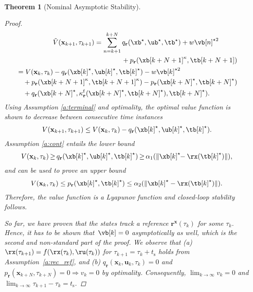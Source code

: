 \documentclass[journal]{IEEEtran}
\newcommand{\x}{{\mathbf{x}}}
\renewcommand{\u}{{\mathbf{u}}}
\renewcommand{\r}{{\mathbf{r}}}
\newcommand{\bx}{{\x}}
\newcommand{\bu}{{\u}}
\newcommand{\btau}{{\tau}}
\newcommand{\review}[1]{#1}
\newtheorem{Theorem}{Theorem}
\begin{document}
\begin{Theorem} [Nominal Asymptotic Stability]
\begin{proof}
			\begin{align*}
			\begin{aligned}\begin{split}
			\tilde{V}(\x_{k+1},\tau_{k+1})&=\sum_{n=k+1}^{k+N} q_\r(\xb^\star,\ub^\star,\tb^\star)  + w\vb[n]^{\star{}2}\\&\qquad\qquad+ p_\r(\xb[k+N+1]^\kappa,\tb[k+N+1])
			\end{split}\\
			\end{aligned}\\
			\begin{aligned}
			&=V(\x_k,\tau_k) - q_\r(\xb[k]^\star,\ub[k]^\star,\tb[k]^\star) - w\vb[k]^{\star{}2}\\
			&\quad+ p_\r(\xb[k+N+1]^\kappa,\tb[k+N+1]^\kappa) - p_\r(\xb[k+N]^\star,\tb[k+N]^\star)\\
			&\quad+ q_\r(\xb[k+N]^\star,\kappa^\mathrm{f}_\r(\xb[k+N]^\star,\tb[k+N]^\star),\tb[k+N]^\star).
			\end{aligned}
			\end{align*}
			Using Assumption \ref{a:terminal} and optimality, the optimal value function is shown to decrease between consecutive time instances
			\begin{equation}
			V(\x_{k+1},\tau_{k+1}) 
			\leq{} V(\x_k,\tau_k) - q_\r(\xb[k]^\star,\ub[k]^\star,\tb[k]^\star).
			\end{equation}
			Assumption \ref{a:cont} entails the lower bound 
			\begin{equation}
			V(\x_k,\tau_k)\hspace{-.1em}\geq{}\hspace{-.1em}q_\r(\xb[k]^\star,\ub[k]^\star,\tb[k]^\star)
			\hspace{-.1em}\geq{}\hspace{-.1em}\alpha_1(\|\xb[k]^\star\hspace{-0.3em}-\rx(\tb[k]^\star)\|),
			\end{equation}
			and can be used to prove an upper bound \cite[Proposition 2.17]{rawlings2009model}
			\begin{equation}
			V(\x_k,\tau_k) \leq{} p_\r(\xb[k]^\star,\tb[k]^\star) \leq{} \alpha_2(\|\xb[k]^\star-\rx(\tb[k]^\star)\|).
			\end{equation}
			Therefore, the value function is a Lyapunov function and closed-loop stability follows. 
			
			So far, we have proven that the states track a reference $\r^\x(\tau_k)$ \emph{for some} $\tau_k$. Hence, it has to be shown that~$\vb[k]=0$ asymptotically as well, which is the second and non-standard part of the proof.
			We observe that (a) \review{$\rx(\tau_{k+1}) = f(\rx(\tau_k),\ru(\tau_k))$ for $\tau_{k+1}=\tau_k+t_\mathrm{s}$ holds from Assumption~\ref{a:rec_ref}}, and (b) $q_\r(\bx_k,\bu_k,\btau_k)=0$ and $p_\r(\bx_{k+N},\btau_{k+N})=0 \Rightarrow v_k=0$ by optimality. Consequently, $\lim_{k\to \infty}v_k=0$ and $\lim_{k\to \infty}\tau_{k+1}-\tau_k=t_\mathrm{s}$.
			

\end{proof}
\end{Theorem}
\end{document}
